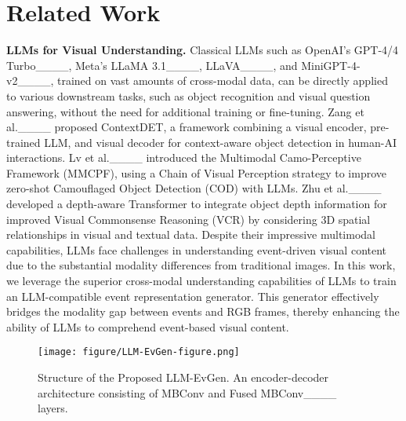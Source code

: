 \section{Related Work}
\noindent \textbf{LLMs for Visual Understanding.} Classical LLMs such as OpenAI's GPT-4/4 Turbo____, Meta's LLaMA 3.1____, LLaVA____, and MiniGPT-4-v2____, trained on vast amounts of cross-modal data, can be directly applied to various downstream tasks, such as object recognition and visual question answering, without the need for additional training or fine-tuning. Zang et al.____ proposed ContextDET, a framework combining a visual encoder, pre-trained LLM, and visual decoder for context-aware object detection in human-AI interactions. Lv et al.____ introduced the Multimodal Camo-Perceptive Framework (MMCPF), using a Chain of Visual Perception strategy to improve zero-shot Camouflaged Object Detection (COD) with LLMs. Zhu et al.____ developed a depth-aware Transformer to integrate object depth information for improved Visual Commonsense Reasoning (VCR) by considering 3D spatial relationships in visual and textual data.
Despite their impressive multimodal capabilities, LLMs face challenges in understanding event-driven visual content due to the substantial modality differences from traditional images. In this work, we leverage the superior cross-modal understanding capabilities of LLMs to train an LLM-compatible event representation generator. This generator effectively bridges the modality gap between events and RGB frames, thereby enhancing the ability of LLMs to comprehend event-based visual content.

\begin{figure}[t]
  \centering
  \texttt{[image: figure/LLM-EvGen-figure.png]}
  \caption{Structure of the Proposed LLM-EvGen. An encoder-decoder architecture consisting of MBConv and Fused MBConv____ layers.}
  \label{fig:network framework}
\end{figure}

